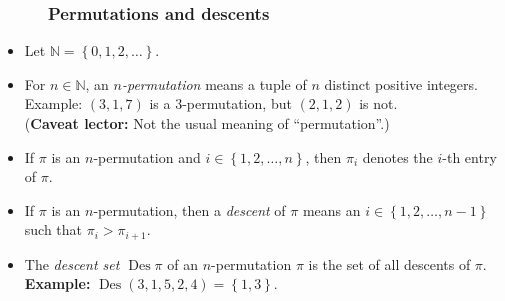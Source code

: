 \documentclass{beamer}
\newcommand{\NN}{{\mathbb N}}
\newcommand{\Des}{\operatorname{Des}}
\newcommand{\fti}[1]{\frametitle{\ \ \ \ \ #1}}
\newcommand{\set}[1]{\left\{ #1 \right\}}
\newcommand{\tup}[1]{\left( #1 \right)}
\newcommand{\defn}[1]{{\color{darkred}\emph{#1}}} %
\theoremstyle{plain}
\begin{document}
\begin{frame}
\fti{Permutations and descents}

\begin{itemize}

\item Let $\NN = \set{0, 1, 2, \ldots}$.

\item For $n \in \NN$, an \defn{$n$-permutation} means a tuple of $n$
distinct positive integers. \\
Example: $\tup{3, 1, 7}$ is a $3$-permutation, but
         $\tup{2, 1, 2}$ is not.
      \\
      (\textbf{Caveat lector:} Not the usual meaning of ``permutation''.) \\

\pause

\item If $\pi$ is an $n$-permutation and $i \in \set{1, 2, \ldots, n}$,
      then \defn{$\pi_i$} denotes the $i$-th entry of $\pi$.

\pause

\item If $\pi$ is an $n$-permutation, then a \defn{descent} of $\pi$
      means an $i \in \set{1, 2, \ldots, n-1}$ such that
      $\pi_i > \pi_{i+1}$.

\item The \defn{descent set $\Des \pi$} of an $n$-permutation $\pi$ is
      the set of all descents of $\pi$. \\
      \textbf{Example:} $\Des \tup{3, 1, 5, 2, 4} = \set{1, 3}$.

\end{itemize}
\end{frame}
\end{document}
